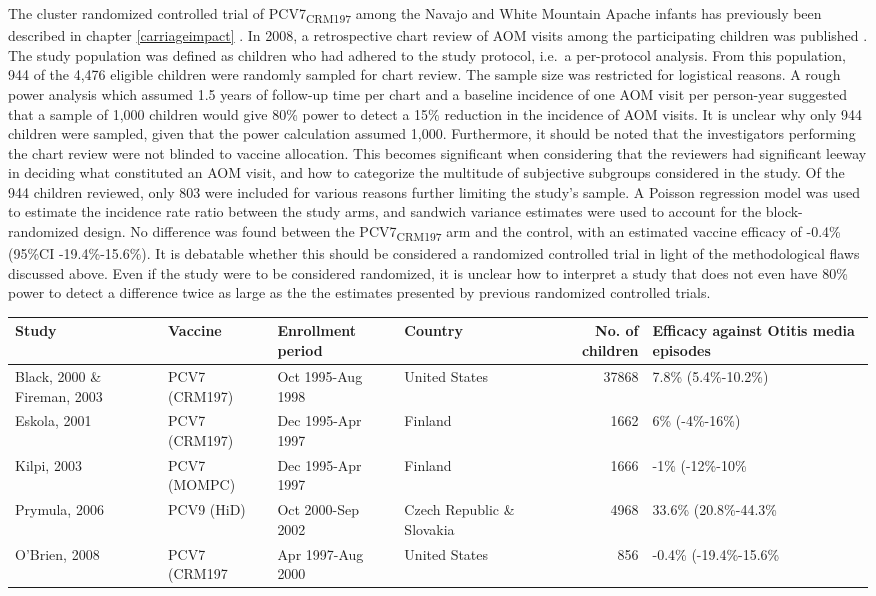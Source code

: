 \documentclass[]{book}
\theoremstyle{definition}
\theoremstyle{definition}
\theoremstyle{definition}
\theoremstyle{remark}
\begin{document}
The cluster randomized controlled trial of PCV7\textsubscript{CRM197}
among the Navajo and White Mountain Apache infants has previously been
described in chapter \ref{carriageimpact} \citep{OBrien2003}. In 2008, a
retrospective chart review of AOM visits among the participating
children was published \citep{OBrien2008}. The study population was
defined as children who had adhered to the study protocol, i.e.~a
per-protocol analysis. From this population, 944 of the 4,476 eligible
children were randomly sampled for chart review. The sample size was
restricted for logistical reasons. A rough power analysis which assumed
1.5 years of follow-up time per chart and a baseline incidence of one
AOM visit per person-year suggested that a sample of 1,000 children
would give 80\% power to detect a 15\% reduction in the incidence of AOM
visits. It is unclear why only 944 children were sampled, given that the
power calculation assumed 1,000. Furthermore, it should be noted that
the investigators performing the chart review were not blinded to
vaccine allocation. This becomes significant when considering that the
reviewers had significant leeway in deciding what constituted an AOM
visit, and how to categorize the multitude of subjective subgroups
considered in the study. Of the 944 children reviewed, only 803 were
included for various reasons further limiting the study's sample. A
Poisson regression model was used to estimate the incidence rate ratio
between the study arms, and sandwich variance estimates were used to
account for the block-randomized design. No difference was found between
the PCV7\textsubscript{CRM197} arm and the control, with an estimated
vaccine efficacy of -0.4\% (95\%CI -19.4\%-15.6\%). It is debatable
whether this should be considered a randomized controlled trial in light
of the methodological flaws discussed above. Even if the study were to
be considered randomized, it is unclear how to interpret a study that
does not even have 80\% power to detect a difference twice as large as
the the estimates presented by previous randomized controlled trials.

\begin{tabular}{llllrl}
\toprule
Study & Vaccine & Enrollment period & Country & No. of children & Efficacy against Otitis media episodes\\
\midrule
Black, 2000 \& Fireman, 2003 & PCV7 (CRM197) & Oct 1995-Aug 1998 & United States & 37868 & 7.8\% (5.4\%-10.2\%)\\
Eskola, 2001 & PCV7 (CRM197) & Dec 1995-Apr 1997 & Finland & 1662 & 6\% (-4\%-16\%)\\
Kilpi, 2003 & PCV7 (MOMPC) & Dec 1995-Apr 1997 & Finland & 1666 & -1\% (-12\%-10\%\\
Prymula, 2006 & PCV9 (HiD) & Oct 2000-Sep 2002 & Czech Republic \& Slovakia & 4968 & 33.6\% (20.8\%-44.3\%\\
O'Brien, 2008 & PCV7 (CRM197 & Apr 1997-Aug 2000 & United States & 856 & -0.4\% (-19.4\%-15.6\%\\
\bottomrule
\end{tabular}
\end{document}
